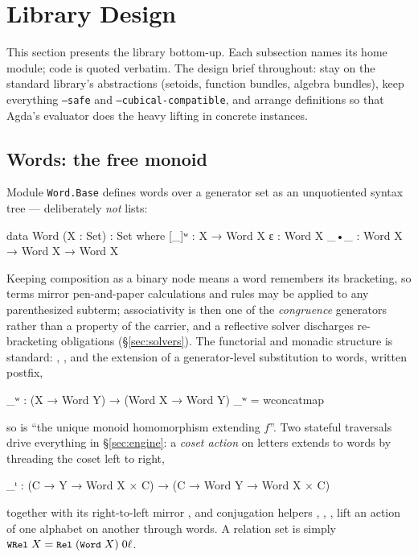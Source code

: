 \section{Library Design}\label{sec:design}

This section presents the library bottom-up.  Each subsection names its
home module; code is quoted verbatim.  The design brief throughout: stay on
the standard library's abstractions (setoids, function bundles, algebra
bundles), keep everything \texttt{--safe} and
\texttt{--cubical-compatible}, and arrange definitions so that Agda's
evaluator does the heavy lifting in concrete instances.

\subsection{Words: the free monoid}\label{sec:words}

Module \texttt{Word.Base} defines words over a generator set as an
unquotiented syntax tree --- deliberately \emph{not} lists:

\begin{agdacode}
data Word (X : Set) : Set where
  [_]ʷ : X → Word X
  ε    : Word X
  _•_  : Word X → Word X → Word X
\end{agdacode}

Keeping composition as a binary node means a word remembers its
bracketing, so terms mirror pen-and-paper calculations and rules may be
applied to any parenthesized subterm; associativity is then one of the
\emph{congruence} generators rather than a property of the carrier, and a
reflective solver discharges re-bracketing obligations
(\S\ref{sec:solvers}).  The functorial and monadic structure is standard:
, , and the extension of a generator-level
substitution to words, written postfix,

\begin{agdacode}
_ʷ : (X → Word Y) → (Word X → Word Y)
_ʷ = wconcatmap
\end{agdacode}

so  is ``the unique monoid homomorphism extending $f$''.  Two
stateful traversals drive everything in \S\ref{sec:engine}: a \emph{coset
action} on letters extends to words by threading the coset left to right,

\begin{agdacode}
_ᵗ : (C → Y → Word X × C) → (C → Word Y → Word X × C)
\end{agdacode}

together with its right-to-left mirror , and conjugation
helpers , , ,  lift an
action of one alphabet on another through words.  A relation set is simply
$\mbox{\texttt{\small WRel}}\;X = \mbox{\texttt{\small Rel}}\;(\mbox{\texttt{\small Word}}\;X)\;0\ell$.

